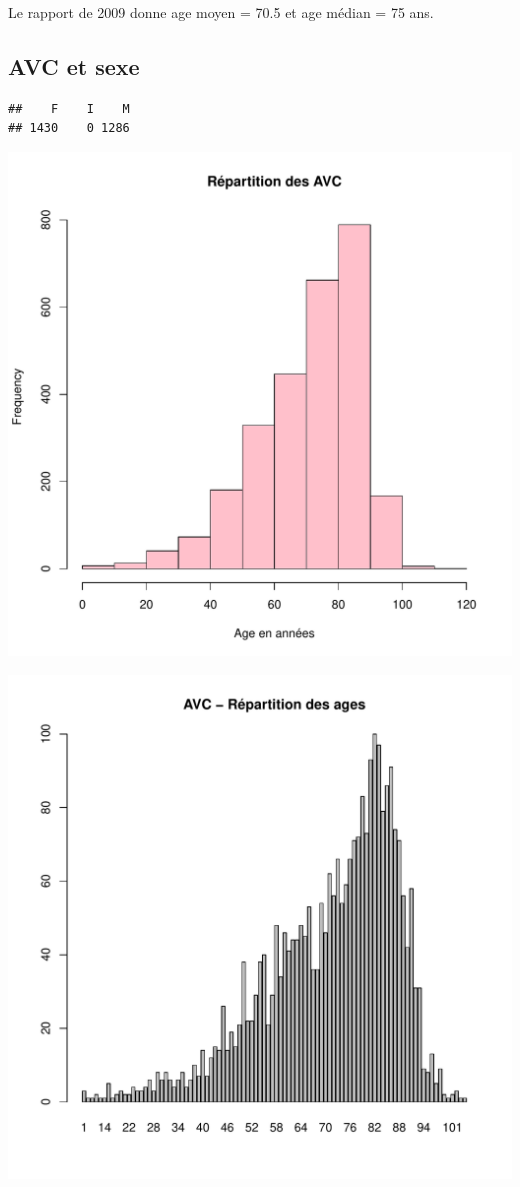 \documentclass[12pt,english,french,twoside]{report}\usepackage[]{graphicx}\usepackage[]{color}
\makeatletter
\def\maxwidth{ %
  \ifdim\Gin@nat@width>\linewidth
    \linewidth
  \else
    \Gin@nat@width
  \fi
}
\newenvironment{kframe}{%
 \def\at@end@of@kframe{}%
 \ifinner\ifhmode%
  \def\at@end@of@kframe{\end{minipage}}%
  \begin{minipage}{\columnwidth}%
 \fi\fi%
 \def\FrameCommand##1{\hskip\@totalleftmargin \hskip-\fboxsep
 \colorbox{shadecolor}{##1}\hskip-\fboxsep
     \hskip-\linewidth \hskip-\@totalleftmargin \hskip\columnwidth}%
 \MakeFramed {\advance\hsize-\width
   \@totalleftmargin\z@ \linewidth\hsize
   \@setminipage}}%
 {\par\unskip\endMakeFramed%
 \at@end@of@kframe}
\newenvironment{knitrout}{}{} %
\makeatother
\begin{document}
Le rapport de 2009 donne age moyen = 70.5 et age médian = 75 ans.

\subsection*{AVC et sexe}
\begin{knitrout}
\color{fgcolor}\begin{kframe}
\begin{verbatim}
##    F    I    M 
## 1430    0 1286
\end{verbatim}
\end{kframe}
\includegraphics[width=\maxwidth]{figure/avc_sexe1} 

\includegraphics[width=\maxwidth]{figure/avc_sexe2} 


\end{knitrout}
\end{document}
